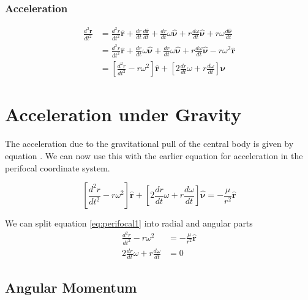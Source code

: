 \subsubsection{Acceleration}

\begin{align}\label{eq:acceleration}
\frac{ d^2 \mathbf{r}}{ d t^2} &= \frac{ d^2 r}{d t^2} \hat{\mathbf{r}} + \frac{d r}{d t} \frac{d \hat{\mathbf{r}}}{d t} +\frac{d r}{d t} \omega \hat{\mathbf{\nu}} +r \frac{d \omega}{d t} \hat{\mathbf{\nu}}+r \omega \frac{d \hat{\mathbf{\nu}}}{d t} \nonumber \\
&=  \frac{ d^2 r}{d t^2} \hat{\mathbf{r}} + \frac{d r}{d t} \omega \hat{\mathbf{\nu}} +\frac{d r}{d t} \omega \hat{\mathbf{\nu}} +r \frac{d \omega}{d t} \hat{\mathbf{\nu}}-r \omega^2 \hat{\mathbf{r}} \nonumber \\
&=\left[  \frac{ d^2 r}{d t^2} -r \omega^2 \right] \hat{\mathbf{r}} + \left[ 2 \frac{d r}{d t} \omega + r \frac{ d \omega}{d t} \right] \hat{\mathbf{\nu}}
\end{align}

\section{Acceleration under Gravity}

The acceleration due to the gravitational pull of the central body is given by equation .
We can now use this with the earlier equation  for acceleration in the perifocal coordinate system.

\begin{equation}
\left[\frac{ d^2 r}{d t^2} -r \omega^2 \right] \hat{\mathbf{r}} + \left[ 2 \frac{d r}{d t} \omega + r \frac{ d \omega}{d t} \right] \hat{\mathbf{\nu}} = -\frac{\mu}{r^2} \hat{\mathbf{r}} \label{eq:perifocal1}
\end{equation}

We can split equation \ref{eq:perifocal1} into radial and angular parts
\begin{align}
\frac{ d^2 r}{d t^2} -r \omega^2 &= -\frac{\mu}{r^2} \hat{\mathbf{r}} \nonumber \\
2 \frac{d r}{d t} \omega + r \frac{ d \omega}{d t} &= 0 \label{eq:perifocal2}
\end{align}


\subsection{Angular Momentum}

